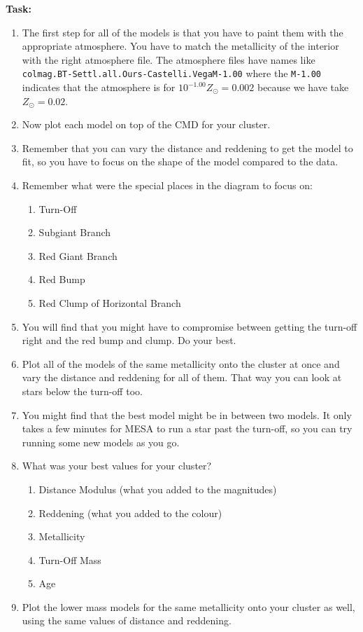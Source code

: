 \documentclass{article}
\begin{document}
\textbf{Task:}
\begin{enumerate}
\setlength{\itemsep}{0pt}
\item
The first step for all of the models is that you have to paint them with the appropriate atmosphere. You have to match the metallicity of the interior with the right atmosphere file.  The atmosphere files have names like \texttt{colmag.BT-Settl.all.Ours-Castelli.VegaM-1.00} where the \texttt{M-1.00} indicates that the atmosphere is for $10^{-1.00} Z_\odot = 0.002$ because we have take $Z_\odot=0.02$.
\item 
Now plot each model on top of the CMD for your cluster.
\item
Remember that you can vary the distance and reddening to get the model to fit, so you have to focus on the shape of the model compared to the data.
\item Remember what were the special places in the diagram to focus on:
\begin{enumerate}
\setlength{\itemsep}{0pt}
    \item Turn-Off
    \item Subgiant Branch
    \item Red Giant Branch
    \item Red Bump
    \item Red Clump of Horizontal Branch
\end{enumerate}
\item You will find that you might have to compromise between getting the turn-off right and the red bump and clump.  Do your best.  
\item Plot all of the models of the same metallicity onto the cluster at once and vary the distance and reddening for all of them.  That way you can look at stars below the turn-off too.  
\item You might find that the best model might be in between two models. It only takes a few minutes for MESA to run a star past the turn-off, so you can try running some new models as you go.
\item What was your best values for your cluster?
\begin{enumerate}
\setlength{\itemsep}{0pt}
    \item Distance Modulus (what you added to the magnitudes)
    \item Reddening (what you added to the colour)
    \item Metallicity
    \item Turn-Off Mass
    \item Age
\end{enumerate}
\item Plot the lower mass models for the same metallicity onto your cluster as well, using the same values of distance and reddening.
\end{enumerate}
\end{document}
